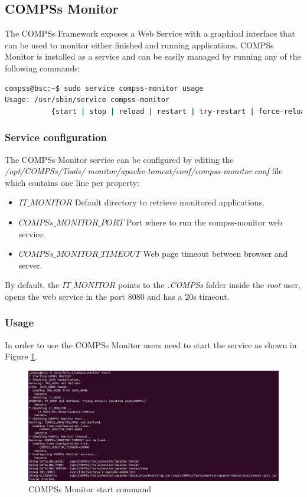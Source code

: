 \subsection{COMPSs Monitor}
\label{subsec:monitor}
The COMPSs Framework exposes a Web Service with a graphical interface that can be used to monitor either finished 
and running applications. COMPSs Monitor is installed as a service and can be easily managed by running any of the following
commands:
\begin{lstlisting}[language=bash]
compss@bsc:~$ sudo service compss-monitor usage
Usage: /usr/sbin/service compss-monitor 
           {start | stop | reload | restart | try-restart | force-reload | status}
\end{lstlisting}

\subsubsection{Service configuration}
The COMPSs Monitor service can be configured by editing the \textit{/opt/COMPSs/Tools/}
\textit{monitor/apache-tomcat/conf/compss-monitor.conf}
file which contains one line per property:
\begin{itemize}
 \item \textbf{$IT\_MONITOR$} Default directory to retrieve monitored applications.
 \item \textbf{$COMPSs\_MONITOR\_PORT$} Port where to run the compss-monitor web service.
 \item \textbf{$COMPSs\_MONITOR\_TIMEOUT$} Web page timeout between browser and server.
\end{itemize}

By default, the $IT\_MONITOR$ points to the \textit{.COMPSs} folder inside the \textit{root} user, opens the web service in the 
port 8080 and has a 20s timeout. 

\subsubsection{Usage}
In order to use the COMPSs Monitor users need to start the service as shown in Figure \ref{fig:monitor_start}.
\begin{figure}[thb!]
  \centering
    \includegraphics[width=\textwidth]{./Sections/4_Tools/Figures/monitor_start.jpeg}
    \caption{COMPSs Monitor start command}
    \label{fig:monitor_start}
\end{figure}

